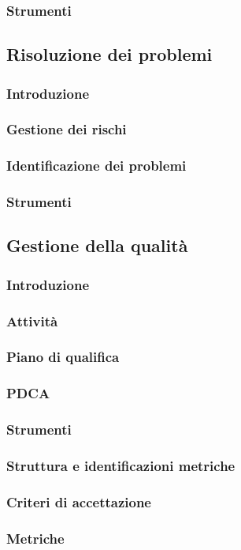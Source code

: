 \subsubsection{Strumenti}
\subsection{Risoluzione dei problemi}
\subsubsection{Introduzione}
\subsubsection{Gestione dei rischi}
\subsubsection{Identificazione dei problemi}
\subsubsection{Strumenti}
\subsection{Gestione della qualità}
\subsubsection{Introduzione}
\subsubsection{Attività}
\subsubsection{Piano di qualifica}
\subsubsection{PDCA}
\subsubsection{Strumenti}
\subsubsection{Struttura e identificazioni metriche}
\subsubsection{Criteri di accettazione}
\subsubsection{Metriche}
